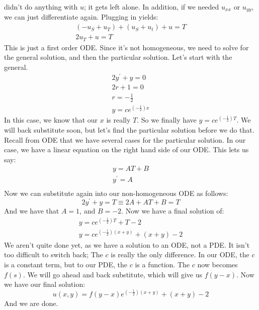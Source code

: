 \documentclass{article}
\begin{document}
didn't do anything with $u$; it gets left alone. In addition, if we needed
$u_{xx}$ or $u_{yy}$, we can just differentiate again. Plugging in yields:
\begin{gather*}
(-u_{S} + u_{T}) + (u_{S} + u_{t}) + u = T\\
2u_{T} + u = T
\end{gather*}
\noindent This is just a first order ODE. Since it's not homogeneous, we need to
solve for the general solution, and then the particular solution. Let's start
with the general.
\begin{gather*}
2y^{'} + y = 0\\
2r + 1 = 0\\
r = -\frac{1}{2}\\
y = ce^{\left(-\frac{1}{2}\right)x}
\end{gather*}
\noindent In this case, we know that our $x$ is really $T$. So we finally have
$y = ce^{\left(-\frac{1}{2}\right)T}$. We will back substitute soon, but let's
find the particular solution before we do that.
\noindent Recall from ODE that we have several cases for the particular
solution. In our case, we have a linear equation on the right hand side of our
ODE. This lets us say:
\begin{gather*}
y = AT + B\\
y^{'} = A\\
\end{gather*}
\noindent Now we can substitute again into our non-homogeneous ODE as follows:
\[
2y^{'} + y = T \equiv 2A + AT + B = T
\]
\noindent And we have that $A = 1$, and $B = -2$. Now we have a final solution of:
\begin{gather*}
y = ce^{\left(-\frac{1}{2}\right)T} + T - 2\\
y = ce^{\left(-\frac{1}{2}\right)(x+y)} + (x + y) - 2
\end{gather*}
\noindent We aren't quite done yet, as we have a solution to an ODE, not a PDE.
It isn't too difficult to switch back; The $c$ is really the only difference. In
our ODE, the $c$ is a constant term, but to our PDE, the $c$ is a function. The
$c$ now becomes $f(s)$. We will go ahead and back substitute, which will give us
$f(y-x)$. Now we have our final solution:
\[
u(x,y) = f(y-x)e^{\left(-\frac{1}{2}\right)(x+y)} + (x + y) - 2
\]
\noindent And we are done.


\newpage
\end{document}
